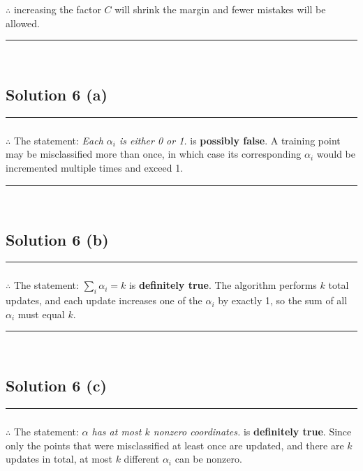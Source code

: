 \documentclass{article}
\begin{document}
\subsubsection*{\normalfont}{$\therefore$ increasing the factor $C$ will shrink the margin and fewer mistakes will be allowed.

\noindent\rule{\textwidth}{0.4pt}\\

\newpage

\subsection*{Solution 6 (a)}
\noindent\rule{\textwidth}{0.4pt}

\subsubsection*{\normalfont}{$\therefore$ The statement: \textit{Each $\alpha_{i}$ is either 0 or 1.} is \textbf{possibly false}. A training point may be misclassified more than once, in which case its corresponding $\alpha_i$ would be incremented multiple times and exceed 1.}

\noindent\rule{\textwidth}{0.4pt}\\

\subsection*{Solution 6 (b)}
\noindent\rule{\textwidth}{0.4pt}

\subsubsection*{\normalfont}{$\therefore$ The statement: \textit{$\sum_{i} \alpha_{i} = k$} is \textbf{definitely true}. The algorithm performs $k$ total updates, and each update increases one of the $\alpha_i$ by exactly 1, so the sum of all $\alpha_i$ must equal $k$.}

\noindent\rule{\textwidth}{0.4pt}\\

\subsection*{Solution 6 (c)}
\noindent\rule{\textwidth}{0.4pt}

\subsubsection*{\normalfont}{$\therefore$ The statement: \textit{$\alpha$ has at most $k$ nonzero coordinates.} is \textbf{definitely true}. Since only the points that were misclassified at least once are updated, and there are $k$ updates in total, at most $k$ different $\alpha_i$ can be nonzero.}

}
\end{document}

